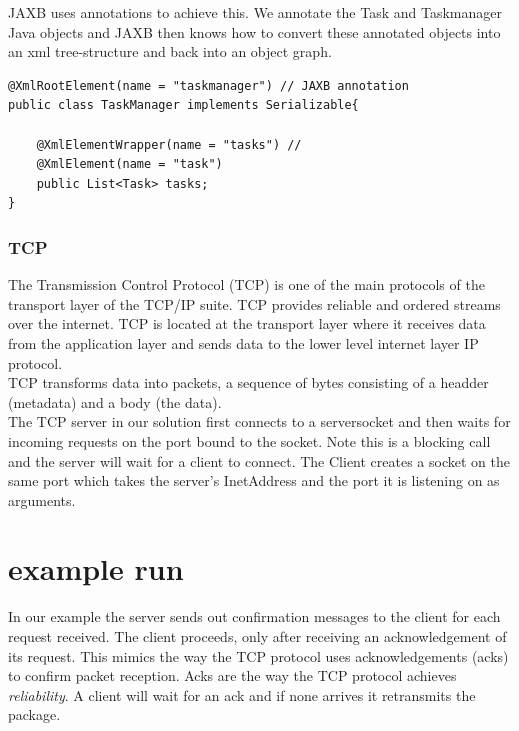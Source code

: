 JAXB uses annotations to achieve this. We annotate the Task and Taskmanager Java objects and JAXB then knows how to convert these annotated objects into an xml tree-structure and back into an object graph.\\

\begin{lstlisting}
@XmlRootElement(name = "taskmanager") // JAXB annotation
public class TaskManager implements Serializable{

	@XmlElementWrapper(name = "tasks") // 
    @XmlElement(name = "task")
    public List<Task> tasks;
}
\end{lstlisting}

\subsubsection{TCP}

The Transmission Control Protocol (TCP) is one of the main protocols of the transport layer of the TCP/IP suite. TCP provides reliable and ordered streams over the internet. TCP is located at the transport layer where it  receives data from the application layer and sends data to the lower level internet layer IP protocol. \\

TCP transforms data into packets, a sequence of bytes consisting of a headder (metadata) and a body (the data). \\

The TCP server in our solution first connects to a serversocket and then waits for incoming requests on the port bound to the socket. Note this is a blocking call and the server will wait for a client to connect. The Client creates a socket on the same port which takes the server's InetAddress and the port it is listening on as arguments. \\

\section{example run}
\label{tcp_example}

In our example the server sends out confirmation messages to the client for each request received. The client proceeds, only after receiving an acknowledgement of its request. This mimics the way the TCP protocol uses acknowledgements (acks) to confirm packet reception. Acks are the way the TCP protocol achieves \textit{reliability}. A client will wait for an ack and if none arrives it retransmits the package.\\   

